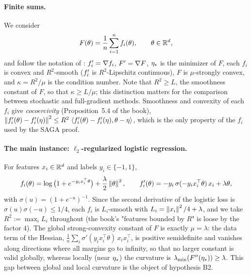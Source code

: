 \paragraph{Finite sums.}
We consider
\begin{equation}\label{eq:finite-sum}
  F(\theta) = \frac1n \sum_{i=1}^n f_i(\theta), \qquad \theta \in \mathbb{R}^d,
\end{equation}
and follow the notation of \cite{bach2024learning}: $f'_i = \nabla f_i$, $F' = \nabla F$, $\eta_\ast$ is the
minimizer of $F$, each $f_i$ is convex and $R^2$-smooth ($f'_i$ is $R^2$-Lipschitz continuous), $F$ is
$\mu$-strongly convex, and $\kappa = R^2/\mu$ is the condition number. Note that $R^2 \ge L$, the smoothness
constant of $F$, so that $\kappa \ge L/\mu$; this distinction matters for the comparison between stochastic and
full-gradient methods. Smoothness and convexity of each $f_i$ give \emph{cocoercivity}
(Proposition~5.4 of the book), $\left\|f'_i(\theta) - f'_i(\eta)\right\|^2 \le R^2\,\left\langle f'_i(\theta) - f'_i(\eta), \theta - \eta \right\rangle$,
which is the only property of the $f_i$ used by the SAGA proof.

\paragraph{The main instance: $\ell_2$-regularized logistic regression.}
For features $x_i \in \mathbb{R}^d$ and labels $y_i \in \{-1, 1\}$,
\begin{equation}\label{eq:logistic}
  f_i(\theta) = \log\big(1 + e^{-y_i x_i^\top \theta}\big) + \frac{\lambda}{2}\left\|\theta\right\|^2,
  \qquad
  f'_i(\theta) = -y_i\,\sigma(-y_i x_i^\top\theta)\,x_i + \lambda\theta,
\end{equation}
with $\sigma(u) = (1+e^{-u})^{-1}$. Since the second derivative of the logistic loss is $\sigma(u)\sigma(-u) \le 1/4$,
each $f_i$ is $L_i$-smooth with $L_i = \left\|x_i\right\|^2/4 + \lambda$, and we take \emph{$R^2 := \max_i L_i$}
throughout (the book's "features bounded by $R$" is loose by the factor $4$). The global strong-convexity
constant of $F$ is exactly $\mu = \lambda$: the data term of the Hessian, $\frac1n\sum_i \sigma'(y_i x_i^\top\theta)\,x_i x_i^\top$,
is positive semidefinite and vanishes along directions where all margins go to infinity, so that no larger constant
is valid globally, whereas locally (near $\eta_\ast$) the curvature is $\lambda_{\min}(F''(\eta_\ast)) \ge \lambda$. This
gap between global and local curvature is the object of hypothesis B2.

